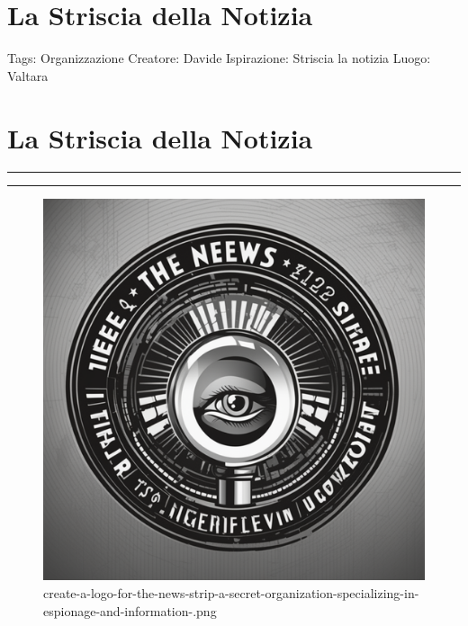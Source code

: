 \section{La Striscia della Notizia}\label{la-striscia-della-notizia}

Tags: Organizzazione Creatore: Davide Ispirazione: Striscia la notizia
Luogo: Valtara

\section{La Striscia della Notizia}\label{la-striscia-della-notizia-1}

\begin{center}\rule{0.5\linewidth}{0.5pt}\end{center}

\begin{center}\rule{0.5\linewidth}{0.5pt}\end{center}

\begin{figure}
\centering
\includegraphics{create-a-logo-for-the-news-strip-a-secret-organization-specializing-in-espionage-and-information-.png}
\caption{create-a-logo-for-the-news-strip-a-secret-organization-specializing-in-espionage-and-information-.png}
\end{figure}

